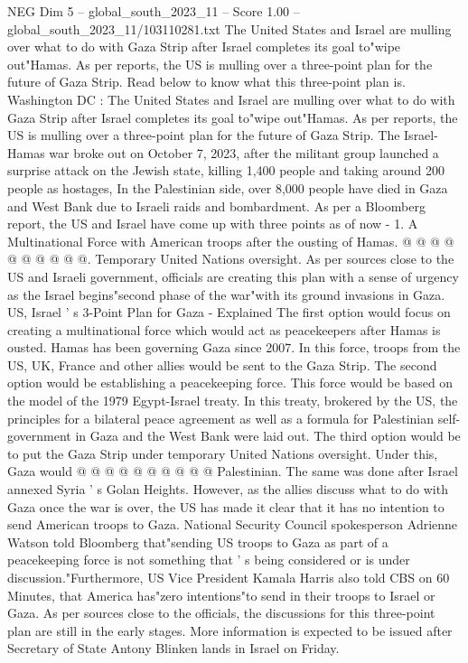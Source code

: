 \begin{textsample}{NEG Dim 5 – global\_south\_2023\_11 – Score 1.00 – global\_south\_2023\_11/103110281.txt}  \label{ex:f5_neg_206}
The United States and Israel are mulling over what to do with Gaza Strip after Israel completes its goal to"wipe out"Hamas.
As per reports, the US is mulling over a three-point plan for the future of Gaza Strip.
Read below to know what this three-point plan is.
Washington DC : The United States and Israel are mulling over what to do with Gaza Strip after Israel completes its goal to"wipe out"Hamas.
As per reports, the US is mulling over a three-point plan for the future of Gaza Strip.
The Israel-Hamas war broke out on October 7, 2023, after the militant group launched a surprise attack on the Jewish state, killing 1,400 people and taking around 200 people as hostages, In the Palestinian side, over 8,000 people have died in Gaza and West Bank due to Israeli raids and bombardment.
As per a Bloomberg report, the US and Israel have come up with three points as of now - 1.
A Multinational Force with American troops after the ousting of Hamas. @ @ @ @ @ @ @ @ @ @.
Temporary United Nations oversight.
As per sources close to the US and Israeli government, officials are creating this plan with a sense of urgency as the Israel begins"second phase of the war"with its ground invasions in Gaza.
US, Israel ' s 3-Point Plan for Gaza - Explained The first option would focus on creating a multinational force which would act as peacekeepers after Hamas is ousted.
Hamas has been governing Gaza since 2007.
In this force, troops from the US, UK, France and other allies would be sent to the Gaza Strip.
The second option would be establishing a peacekeeping force.
This force would be based on the model of the 1979 Egypt-Israel treaty.
In this treaty, brokered by the US, the principles for a bilateral peace agreement as well as a formula for Palestinian self-government in Gaza and the West Bank were laid out.
The third option would be to put the Gaza Strip under temporary United Nations oversight.
Under this, Gaza would @ @ @ @ @ @ @ @ @ @ Palestinian.
The same was done after Israel annexed Syria ' s Golan Heights.
However, as the allies discuss what to do with Gaza once the war is over, the US has made it clear that it has no intention to send American troops to Gaza.
National Security Council spokesperson Adrienne Watson told Bloomberg that"sending US troops to Gaza as part of a peacekeeping force is not something that ' s being considered or is under discussion."Furthermore, US Vice President Kamala Harris also told CBS on 60 Minutes, that America has"zero intentions"to send in their troops to Israel or Gaza.
As per sources close to the officials, the discussions for this three-point plan are still in the early stages.
More information is expected to be issued after Secretary of State Antony Blinken lands in Israel on Friday.

\end{textsample}
